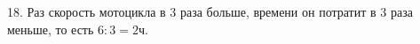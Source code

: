 18. Раз скорость мотоцикла в 3 раза больше, времени он потратит в 3 раза меньше, то есть $6:3=2$ч.\\
